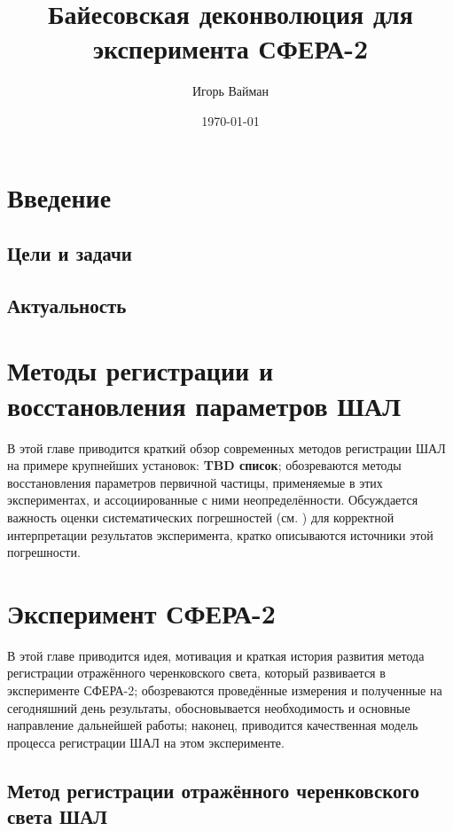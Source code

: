 \documentclass[12pt]{book}
\title{Байесовская деконволюция для эксперимента СФЕРА-2}
\author{Игорь Вайман}
\date{\today}
\begin{document}
	\maketitle
	
	\chapter{Введение}
	
	\section{Цели и задачи}

	\section{Актуальность}
	
	
	\chapter{Методы регистрации и восстановления параметров ШАЛ}
	
	В этой главе приводится краткий обзор современных методов регистрации ШАЛ на примере крупнейших установок: \textbf{TBD список}; обозреваются методы восстановления параметров первичной частицы, применяемые в этих экспериментах, и ассоциированные с ними неопределённости. Обсуждается важность оценки систематических погрешностей (см. \cite{wg2013}) для корректной интерпретации результатов эксперимента, кратко описываются источники этой погрешности.


	\chapter{Эксперимент СФЕРА-2}
	
	В этой главе приводится идея, мотивация и краткая история развития метода регистрации отражённого черенковского света, который развивается в эксперименте СФЕРА-2; обозреваются проведённые измерения и полученные на сегодняшний день результаты, обосновывается необходимость и основные направление дальнейшей работы; наконец, приводится качественная модель процесса регистрации ШАЛ на этом эксперименте.
	
	\section{Метод регистрации отражённого черенковского света ШАЛ}
\end{document}
